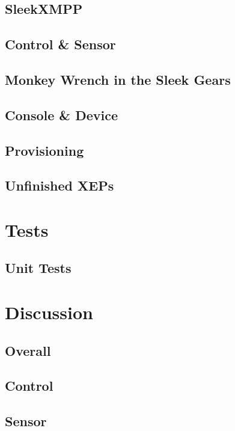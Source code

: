 \documentclass{sig-alternate}
\begin{document}
\subsection{SleekXMPP}

\subsection{Control \& Sensor}

\subsection{Monkey Wrench in the Sleek Gears}

\subsection{Console \& Device}

\subsection{Provisioning}

\subsection{Unfinished XEPs}

\section{Tests}

\subsection{Unit Tests}

\section{Discussion}

\subsection{Overall}

\subsection{Control}

\subsection{Sensor}
\end{document}

